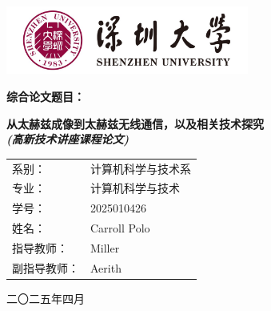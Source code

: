 
\begin{titlepage}
	\centering

	\includegraphics[width=0.6\textwidth]{img/SZU_logo.png} \\
	\vspace{0.5cm} %
	
	\LARGE\bfseries
	综合论文题目： \\
	\vspace{0.5cm} %
	
	\large\bfseries
	从太赫兹成像到太赫兹无线通信，以及相关技术探究 \\
	\textit{(高新技术讲座课程论文)} \\
	
	\vspace{2cm} %
	
	\begin{tabular}{l l}
		系别： & 计算机科学与技术系 \\
		专业： & 计算机科学与技术 \\
		学号： & 2025010426 \\
		姓名： & Carroll Polo \\
		指导教师： & Miller  \\
		副指导教师： & Aerith  \\
	\end{tabular}
	
	\vfill %
	
	\large
	二〇二五年四月 \\
\end{titlepage}



	
